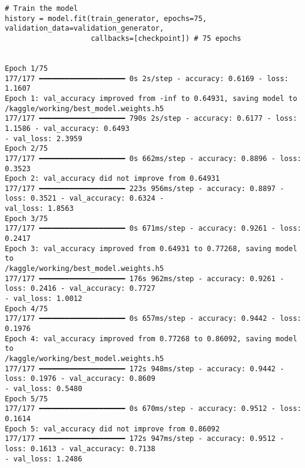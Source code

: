 \documentclass[12pt, English]{article}
\begin{document}
\begin{normalsize}
\begin{verbatim}
# Train the model
history = model.fit(train_generator, epochs=75, validation_data=validation_generator, 
                    callbacks=[checkpoint]) # 75 epochs


Epoch 1/75
177/177 ━━━━━━━━━━━━━━━━━━━━ 0s 2s/step - accuracy: 0.6169 - loss: 1.1607
Epoch 1: val_accuracy improved from -inf to 0.64931, saving model to 
/kaggle/working/best_model.weights.h5
177/177 ━━━━━━━━━━━━━━━━━━━━ 790s 2s/step - accuracy: 0.6177 - loss: 1.1586 - val_accuracy: 0.6493 
- val_loss: 2.3959
Epoch 2/75
177/177 ━━━━━━━━━━━━━━━━━━━━ 0s 662ms/step - accuracy: 0.8896 - loss: 0.3523
Epoch 2: val_accuracy did not improve from 0.64931
177/177 ━━━━━━━━━━━━━━━━━━━━ 223s 956ms/step - accuracy: 0.8897 - loss: 0.3521 - val_accuracy: 0.6324 -
val_loss: 1.8563
Epoch 3/75 
177/177 ━━━━━━━━━━━━━━━━━━━━ 0s 671ms/step - accuracy: 0.9261 - loss: 0.2417
Epoch 3: val_accuracy improved from 0.64931 to 0.77268, saving model to 
/kaggle/working/best_model.weights.h5
177/177 ━━━━━━━━━━━━━━━━━━━━ 176s 962ms/step - accuracy: 0.9261 - loss: 0.2416 - val_accuracy: 0.7727 
- val_loss: 1.0012
Epoch 4/75
177/177 ━━━━━━━━━━━━━━━━━━━━ 0s 657ms/step - accuracy: 0.9442 - loss: 0.1976
Epoch 4: val_accuracy improved from 0.77268 to 0.86092, saving model to 
/kaggle/working/best_model.weights.h5
177/177 ━━━━━━━━━━━━━━━━━━━━ 172s 948ms/step - accuracy: 0.9442 - loss: 0.1976 - val_accuracy: 0.8609 
- val_loss: 0.5480
Epoch 5/75
177/177 ━━━━━━━━━━━━━━━━━━━━ 0s 670ms/step - accuracy: 0.9512 - loss: 0.1614
Epoch 5: val_accuracy did not improve from 0.86092
177/177 ━━━━━━━━━━━━━━━━━━━━ 172s 947ms/step - accuracy: 0.9512 - loss: 0.1613 - val_accuracy: 0.7138 
- val_loss: 1.2486


\end{verbatim}
\end{normalsize}
\end{document}
